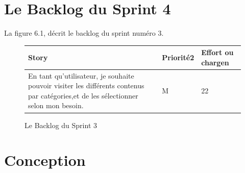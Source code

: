 \section{Le Backlog du Sprint 4}
La figure 6.1, décrit le backlog du sprint numéro 3.
\begin{figure}[H]
\begin{tabular}{|p{7cm}|p{4cm}|p{4cm}|}
\hline
\textbf{Story} & \textbf{Priorité2 } & \textbf{Effort ou chargen} \\
\hline
En tant qu'utilisateur, je souhaite pouvoir visiter les différents contenus par catégories,et de les sélectionner selon mon besoin. & \begin{center}M\end{center} & \begin{center}22\end{center}\\
\hline
\end{tabular}
  \caption{Le Backlog du Sprint 3}
  \label{fig:Backlog3}
\end{figure}
\section{Conception}
